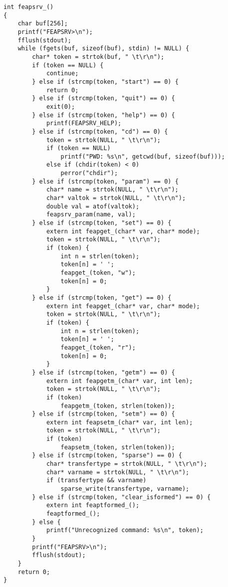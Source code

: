 \begin{verbatim}
int feapsrv_()
{
    char buf[256];
    printf("FEAPSRV>\n");
    fflush(stdout);
    while (fgets(buf, sizeof(buf), stdin) != NULL) {
        char* token = strtok(buf, " \t\r\n");
        if (token == NULL) {
            continue;
        } else if (strcmp(token, "start") == 0) {
            return 0;
        } else if (strcmp(token, "quit") == 0) {
            exit(0);
        } else if (strcmp(token, "help") == 0) {
            printf(FEAPSRV_HELP);
        } else if (strcmp(token, "cd") == 0) {
            token = strtok(NULL, " \t\r\n");
            if (token == NULL) 
                printf("PWD: %s\n", getcwd(buf, sizeof(buf)));
            else if (chdir(token) < 0)
                perror("chdir");
        } else if (strcmp(token, "param") == 0) {
            char* name = strtok(NULL, " \t\r\n");
            char* valtok = strtok(NULL, " \t\r\n");
            double val = atof(valtok);
            feapsrv_param(name, val);
        } else if (strcmp(token, "set") == 0) {
            extern int feapget_(char* var, char* mode);
            token = strtok(NULL, " \t\r\n");
            if (token) {
                int n = strlen(token);
                token[n] = ' ';
                feapget_(token, "w");
                token[n] = 0;
            }
        } else if (strcmp(token, "get") == 0) {
            extern int feapget_(char* var, char* mode);
            token = strtok(NULL, " \t\r\n");
            if (token) {
                int n = strlen(token);
                token[n] = ' ';
                feapget_(token, "r");
                token[n] = 0;
            }
        } else if (strcmp(token, "getm") == 0) {
            extern int feapgetm_(char* var, int len);
            token = strtok(NULL, " \t\r\n");
            if (token)
                feapgetm_(token, strlen(token));
        } else if (strcmp(token, "setm") == 0) {
            extern int feapsetm_(char* var, int len);
            token = strtok(NULL, " \t\r\n");
            if (token)
                feapsetm_(token, strlen(token));
        } else if (strcmp(token, "sparse") == 0) {
            char* transfertype = strtok(NULL, " \t\r\n");
            char* varname = strtok(NULL, " \t\r\n");
            if (transfertype && varname)
                sparse_write(transfertype, varname);
        } else if (strcmp(token, "clear_isformed") == 0) {
            extern int feaptformed_();
            feaptformed_();
        } else {
            printf("Unrecognized command: %s\n", token);
        }
        printf("FEAPSRV>\n");
        fflush(stdout);
    }
    return 0;
}
\end{verbatim}
